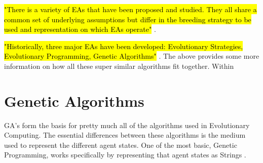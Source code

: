 


\hl{"There is a variety of EAs that have been proposed and studied. They all share a common set of underlying assumptions but differ in the breeding strategy to be used and representation on which EAs operate"} \cite{kicinger2005evolutionary}.


\hl{"Historically, three major EAs have been developed: Evolutionary Strategies, Evolutionary Programming, Genetic Algorithms"} \cite{kicinger2005evolutionary}.
The above provides some more information on how all these super similar algorithms fit together.
Within

\section{Genetic Algorithms}


GA's form the basis for pretty much all of the algorithms used in Evolutionary Computing. The essential differences between these algorithms is the medium used to represent the different agent states. One of the most basic, Genetic Programming, works specifically by representing that agent states as Strings \cite{de1988learning}.


